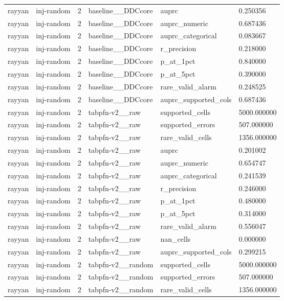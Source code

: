 \begin{tabular}{llllll}
rayyan & inj-random & 2 & baseline\_\_DDCcore & auprc & 0.250356 \\
rayyan & inj-random & 2 & baseline\_\_DDCcore & auprc\_numeric & 0.687436 \\
rayyan & inj-random & 2 & baseline\_\_DDCcore & auprc\_categorical & 0.083667 \\
rayyan & inj-random & 2 & baseline\_\_DDCcore & r\_precision & 0.218000 \\
rayyan & inj-random & 2 & baseline\_\_DDCcore & p\_at\_1pct & 0.840000 \\
rayyan & inj-random & 2 & baseline\_\_DDCcore & p\_at\_5pct & 0.390000 \\
rayyan & inj-random & 2 & baseline\_\_DDCcore & rare\_valid\_alarm & 0.248525 \\
rayyan & inj-random & 2 & baseline\_\_DDCcore & auprc\_supported\_cols & 0.687436 \\
rayyan & inj-random & 2 & tabpfn-v2\_\_raw & supported\_cells & 5000.000000 \\
rayyan & inj-random & 2 & tabpfn-v2\_\_raw & supported\_errors & 507.000000 \\
rayyan & inj-random & 2 & tabpfn-v2\_\_raw & rare\_valid\_cells & 1356.000000 \\
rayyan & inj-random & 2 & tabpfn-v2\_\_raw & auprc & 0.201002 \\
rayyan & inj-random & 2 & tabpfn-v2\_\_raw & auprc\_numeric & 0.654747 \\
rayyan & inj-random & 2 & tabpfn-v2\_\_raw & auprc\_categorical & 0.241539 \\
rayyan & inj-random & 2 & tabpfn-v2\_\_raw & r\_precision & 0.246000 \\
rayyan & inj-random & 2 & tabpfn-v2\_\_raw & p\_at\_1pct & 0.480000 \\
rayyan & inj-random & 2 & tabpfn-v2\_\_raw & p\_at\_5pct & 0.314000 \\
rayyan & inj-random & 2 & tabpfn-v2\_\_raw & rare\_valid\_alarm & 0.556047 \\
rayyan & inj-random & 2 & tabpfn-v2\_\_raw & nan\_cells & 0.000000 \\
rayyan & inj-random & 2 & tabpfn-v2\_\_raw & auprc\_supported\_cols & 0.299215 \\
rayyan & inj-random & 2 & tabpfn-v2\_\_random & supported\_cells & 5000.000000 \\
rayyan & inj-random & 2 & tabpfn-v2\_\_random & supported\_errors & 507.000000 \\
rayyan & inj-random & 2 & tabpfn-v2\_\_random & rare\_valid\_cells & 1356.000000 \\

\end{tabular}
